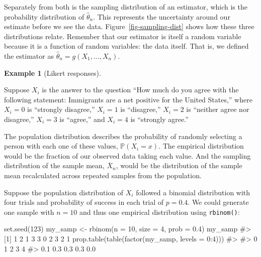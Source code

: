 \documentclass[
  13pt,
  letterpaper,
  DIV=11,
  numbers=noendperiod]{scrreprt}
\newenvironment{Shaded}{\begin{snugshade}}{\end{snugshade}}
\newcommand{\AttributeTok}[1]{\textcolor[rgb]{0.40,0.45,0.13}{#1}}
\newcommand{\CommentTok}[1]{\textcolor[rgb]{0.37,0.37,0.37}{#1}}
\newcommand{\DecValTok}[1]{\textcolor[rgb]{0.68,0.00,0.00}{#1}}
\newcommand{\FloatTok}[1]{\textcolor[rgb]{0.68,0.00,0.00}{#1}}
\newcommand{\FunctionTok}[1]{\textcolor[rgb]{0.28,0.35,0.67}{#1}}
\newcommand{\NormalTok}[1]{\textcolor[rgb]{0.00,0.23,0.31}{#1}}
\newcommand{\OtherTok}[1]{\textcolor[rgb]{0.00,0.23,0.31}{#1}}
\newcommand{\SpecialCharTok}[1]{\textcolor[rgb]{0.37,0.37,0.37}{#1}}
\renewcommand{\P}{\mathbb{P}}
\newcommand{\Xbar}{\overline{X}}
\theoremstyle{plain}
\theoremstyle{plain}
\theoremstyle{definition}
\theoremstyle{definition}
\newtheorem{example}{Example}[chapter]
\theoremstyle{remark}
\begin{document}
Separately from both is the sampling distribution of an estimator, which
is the probability distribution of \(\widehat{\theta}_n\). This
represents the uncertainty around our estimate before we see the data.
Figure~\ref{fig-sampling-dist} shows how these three distributions
relate. Remember that our estimator is itself a random variable because
it is a function of random variables: the data itself. That is, we
defined the estimator as \(\widehat{\theta}_n = g(X_1, \ldots, X_n)\).

\begin{example}[Likert
responses]\protect\hypertarget{exm-three-dist}{}\label{exm-three-dist}

Suppose \(X_i\) is the answer to the question ``How much do you agree
with the following statement: Immigrants are a net positive for the
United States,'' where \(X_i = 0\) is ``strongly disagree,'' \(X_i = 1\)
is ``disagree,'' \(X_i = 2\) is ``neither agree nor disagree,''
\(X_i = 3\) is ``agree,'' and \(X_i = 4\) is ``strongly agree.''

The population distribution describes the probability of randomly
selecting a person with each one of these values, \(\P(X_i = x)\). The
empirical distribution would be the fraction of our observed data taking
each value. And the sampling distribution of the sample mean,
\(\Xbar_n\), would be the distribution of the sample mean recalculated
across repeated samples from the population.

Suppose the population distribution of \(X_i\) followed a binomial
distribution with four trials and probability of success in each trial
of \(p = 0.4\). We could generate one sample with \(n = 10\) and thus
one empirical distribution using \texttt{rbinom()}:

\begin{Shaded}
\begin{Highlighting}[]
\FunctionTok{set.seed}\NormalTok{(}\DecValTok{123}\NormalTok{)}
\NormalTok{my\_samp }\OtherTok{\textless{}{-}} \FunctionTok{rbinom}\NormalTok{(}\AttributeTok{n =} \DecValTok{10}\NormalTok{, }\AttributeTok{size =} \DecValTok{4}\NormalTok{, }\AttributeTok{prob =} \FloatTok{0.4}\NormalTok{)}
\NormalTok{my\_samp}
\CommentTok{\#\textgreater{}  [1] 1 2 1 3 3 0 2 3 2 1}
\FunctionTok{prop.table}\NormalTok{(}\FunctionTok{table}\NormalTok{(}\FunctionTok{factor}\NormalTok{(my\_samp, }\AttributeTok{levels =} \DecValTok{0}\SpecialCharTok{:}\DecValTok{4}\NormalTok{)))}
\CommentTok{\#\textgreater{} }
\CommentTok{\#\textgreater{}   0   1   2   3   4 }
\CommentTok{\#\textgreater{} 0.1 0.3 0.3 0.3 0.0}
\end{Highlighting}
\end{Shaded}


\end{example}
\end{document}
